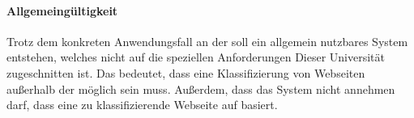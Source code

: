         \paragraph*{Allgemeingültigkeit}
        Trotz dem konkreten Anwendungsfall an der {\fernUni}
        soll ein allgemein nutzbares System entstehen,
        welches nicht auf die speziellen Anforderungen Dieser Universität
        zugeschnitten ist.
        Das bedeutet, dass eine Klassifizierung von Webseiten außerhalb
        der {\fernUni} möglich sein muss.
        Außerdem, dass das System nicht annehmen darf,
        dass eine zu klassifizierende Webseite auf {\wordpress} basiert.
